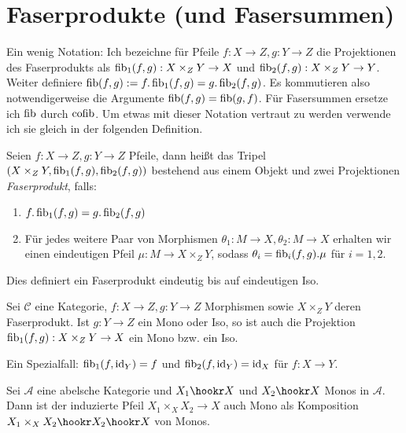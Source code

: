\section{Faserprodukte (und Fasersummen)}

Ein wenig Notation: Ich bezeichne für Pfeile $f : X\to Z, g: Y\to Z$ die Projektionen des Faserprodukts als $\operatorname{fib}_1(f,g) : X\times_Z Y \to X$ und $\operatorname{fib}_2(f,g) : X\times_Z Y \to Y$. Weiter definiere $\operatorname{fib}(f,g) := f.\operatorname{fib}_1(f,g) = g.\operatorname{fib}_2(f,g)$.
Es kommutieren also notwendigerweise die Argumente $\operatorname{fib}(f,g) = \operatorname{fib}(g,f)$.
Für Fasersummen ersetze ich $\operatorname{fib}$ durch $\operatorname{cofib}$.
Um etwas mit dieser Notation vertraut zu werden verwende ich sie gleich in der folgenden Definition.

\begin{defn}
Seien $f:X\to Z, g:Y\to Z$ Pfeile, dann heißt das Tripel $(X\times_Z Y, \operatorname{fib}_1(f,g), \operatorname{fib}_2(f,g))$ bestehend aus einem Objekt und zwei Projektionen \emph{Faserprodukt}, falls:
\begin{enumerate}
\item $f.\operatorname{fib}_1(f,g) = g.\operatorname{fib}_2(f,g)$
\item Für jedes weitere Paar von Morphismen $\theta_1 : M \to X, \theta_2 : M \to X$ erhalten wir einen eindeutigen Pfeil $\mu : M \to X\times_Z Y$, sodass $\theta_i = \operatorname{fib}_i(f,g) . \mu$ für $i=1,2$.
\end{enumerate}
Dies definiert ein Faserprodukt eindeutig bis auf eindeutigen Iso.
\end{defn}

\begin{prop}\label{fibre-mono}
Sei $\mathcal C$ eine Kategorie, $f : X \to Z, g : Y\to Z$ Morphismen sowie $X\times_Z Y$ deren Faserprodukt. Ist $g: Y\to Z$ ein Mono oder Iso, so ist auch die Projektion $\operatorname{fib}_1(f,g): X\times_Z Y \to X$ ein Mono bzw. ein Iso.
\end{prop}

\begin{prop}
Ein Spezialfall: $\operatorname{fib}_1(f,\operatorname{id}_Y) = f$ und $\operatorname{fib}_2(f,\operatorname{id}_Y) = \operatorname{id}_X$ für $f : X\to Y$.
\end{prop}

\begin{korr}
Sei $\mathcal A$ eine abelsche Kategorie und
$X_1 \hookr X$ und $X_2 \hookr X$ Monos in $\mathcal A$. Dann ist der induzierte Pfeil $X_1 \times_X X_2 \to X$ auch Mono als Komposition $X_1\times_X X_2 \hookr X_2 \hookr X$ von Monos.
\end{korr}

